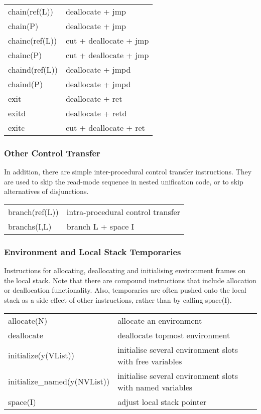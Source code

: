 \begin{tabular}{|p{}|p{}|}
\hline
chain(ref(L))           & deallocate + jmp \\
chain(P)                & deallocate + jmp \\
chainc(ref(L))          & cut + deallocate + jmp \\
chainc(P)               & cut + deallocate + jmp \\
chaind(ref(L))          & deallocate + jmpd \\
chaind(P)               & deallocate + jmpd \\
exit                    & deallocate + ret \\
exitd                   & deallocate + retd \\
exitc                   & cut + deallocate + ret \\
\hline
\end{tabular}



\subsubsection{Other Control Transfer}
In addition, there are simple inter-procedural control transfer instructions.
They are used to skip the read-mode sequence in nested unification code, or
to skip alternatives of disjunctions.

\begin{tabular}{|p{}|p{}|}
\hline
branch(ref(L))          & intra-procedural control transfer \\
branchs(I,L)            & branch L + space I \\
\hline
\end{tabular}


\subsubsection{Environment and Local Stack Temporaries}
Instructions for allocating, deallocating and initialising environment frames
on the local stack. Note that there are compound instructions that include
allocation or deallocation functionality. Also, temporaries are often
pushed onto the local stack as a side effect of other instructions, rather
than by calling space(I).

\begin{tabular}{|p{}|p{}|}
\hline
allocate(N)             & allocate an environment \\
deallocate              & deallocate topmost environment \\
initialize(y(VList))    & initialise several environment slots with free variables \\
initialize_named(y(NVList))     & initialise several environment slots with named variables \\
space(I)                & adjust local stack pointer \\
\hline
\end{tabular}

